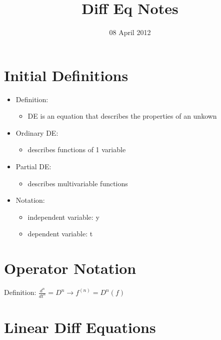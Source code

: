 \documentclass[11pt]{article}
\title{Diff Eq Notes}
\author{}
\date{08 April 2012}
\begin{document}
\maketitle

\setcounter{tocdepth}{3}
\tableofcontents
\vspace*{1cm}


\section{Initial Definitions}
\label{sec-1}

\begin{itemize}
\item Definition:

\begin{itemize}
\item DE is an equation that describes the properties of an unkown
\end{itemize}

\item Ordinary DE:

\begin{itemize}
\item describes functions of 1 variable
\end{itemize}

\item Partial DE:

\begin{itemize}
\item describes multivariable functions
\end{itemize}

\item Notation:

\begin{itemize}
\item independent variable: y
\item dependent variable: t
\end{itemize}

\end{itemize}
\section{Operator Notation}
\label{sec-2}

  Definition:
  $\frac{d^n}{dt^n} = D^n \rightarrow f^{(n)} = D^n(f)$
\section{Linear Diff Equations}
\label{sec-3}
\end{document}
